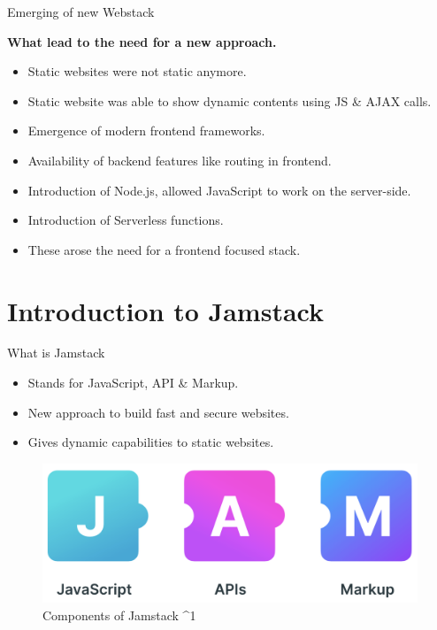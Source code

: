 \documentclass[aspectratio=169,9pt]{beamer}
\begin{document}
\begin{frame}{Emerging of new Webstack}

    \textbf{What lead to the need for a new approach.}
    \vspace{1em}
    \begin{itemize}
       \item Static websites were not static anymore.
       \item Static website was able to show dynamic contents using JS \& AJAX calls.
       \item Emergence of modern frontend frameworks.
       \item Availability of backend features like routing in frontend.
       \item Introduction of Node.js, allowed JavaScript to work on the server-side.
       \item Introduction of Serverless functions.
       \item These arose the need for a frontend focused stack.
   \end{itemize}
\end{frame}

\section{Introduction to Jamstack}
\begin{frame}{What is Jamstack}
    \begin{itemize}
        \item Stands for JavaScript, API & Markup.
        \item New approach to build fast and secure websites.
        \item Gives dynamic capabilities to static websites.
    \end{itemize}
    
    \vfill
    
    \begin{figure}
        \begin{center}
            \includegraphics[scale=.18]{./images/components.png}
            \caption{Components of Jamstack ^1}
        \end{center} 
    \end{figure}
    
\end{frame}
\end{document}
